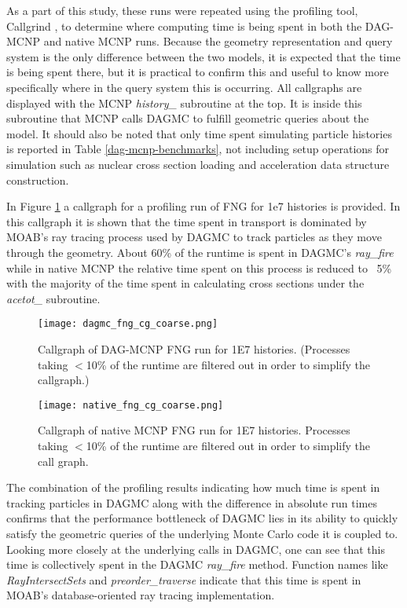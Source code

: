 As a part of this study, these runs were repeated using the profiling tool,
Callgrind \cite{Pena_2016}, to determine where computing time is being spent in
both the DAG-MCNP and native MCNP runs. Because the geometry representation and
query system is the only difference between the two models, it is expected that
the time is being spent there, but it is practical to confirm this and useful to
know more specifically where in the query system this is occurring. All
callgraphs are displayed with the MCNP \textit{history\_} subroutine at the
top. It is inside this subroutine that MCNP calls DAGMC to fulfill geometric
queries about the model. It should also be noted that only time spent simulating
particle histories is reported in Table \ref{dag-mcnp-benchmarks}, not including
setup operations for simulation such as nuclear cross section loading and
acceleration data structure construction.

In Figure \ref{dagmc-fng-coarse} a callgraph for a profiling run of FNG for 1e7
histories is provided. In this callgraph it is shown that the time spent in
transport is dominated by MOAB's ray tracing process used by DAGMC to track
particles as they move through the geometry. About 60\% of the runtime is spent
in DAGMC's \textit{ray\_fire} while in native MCNP the relative time spent on
this process is reduced to ~5\% with the majority of the time spent in
calculating cross sections under the \textit{acetot\_} subroutine.

\begin{figure}[H]
  \centering
  \caption{Callgraph of DAG-MCNP FNG run for \num{1E7} histories. (Processes taking
    $<$10\% of the runtime are filtered out in order to simplify the callgraph.)}
  \label{dagmc-fng-coarse}
  \texttt{[image: dagmc\_fng\_cg\_coarse.png]}
\end{figure}

\begin{figure}[H]
  \centering
  \caption{Callgraph of native MCNP FNG run for \num{1E7} histories. Processes taking
    $<$10\% of the runtime are filtered out in order to simplify the call
    graph.}
  \label{mcnp-fng-coarse}
  \texttt{[image: native\_fng\_cg\_coarse.png]}
\end{figure}


The combination of the profiling results indicating how much time is spent in
tracking particles in DAGMC along with the difference in absolute run times
confirms that the performance bottleneck of DAGMC lies in its ability to quickly
satisfy the geometric queries of the underlying Monte Carlo code it is coupled
to. Looking more closely at the underlying calls in DAGMC, one can see that this
time is collectively spent in the DAGMC \textit{ray\_fire} method. Function names
like \textit{RayIntersectSets} and \textit{preorder\_traverse} indicate that
this time is spent in MOAB's database-oriented ray tracing implementation.

